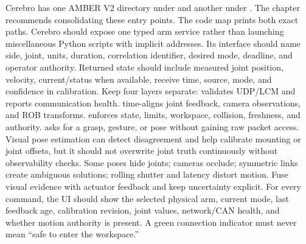 {}
\markdownRendererSectionEnd \markdownRendererSectionBegin
{}\markdownRendererInterblockSeparator
{}\markdownRendererBlockQuoteBegin
{} Cerebro has one AMBER V2 directory under  and another under . The chapter recommends consolidating these entry points. The code map prints both exact paths.\markdownRendererBlockQuoteEnd \markdownRendererInterblockSeparator
{}Cerebro should expose one typed arm service rather than launching miscellaneous Python scripts with implicit addresses. Its interface should name side, joint, units, duration, correlation identifier, desired mode, deadline, and operator authority. Returned state should include measured joint position, velocity, current/status when available, receive time, source, mode, and confidence in calibration.\markdownRendererParagraphSeparator
{}Keep four layers separate:\markdownRendererInterblockSeparator
{}\markdownRendererOlBegin
{} validates UDP/LCM and reports communication health.\markdownRendererOlItemEnd 
{} time-aligns joint feedback, camera observations, and ROB transforms.\markdownRendererOlItemEnd 
{} enforces state, limits, workspace, collision, freshness, and authority.\markdownRendererOlItemEnd 
{} asks for a grasp, gesture, or pose without gaining raw packet access.\markdownRendererOlItemEnd 
\markdownRendererOlEnd \markdownRendererInterblockSeparator
{}Visual pose estimation can detect disagreement and help calibrate mounting or joint offsets, but it should not overwrite joint truth continuously without observability checks. Some poses hide joints; cameras occlude; symmetric links create ambiguous solutions; rolling shutter and latency distort motion. Fuse visual evidence with actuator feedback and keep uncertainty explicit.\markdownRendererParagraphSeparator
{}For every command, the UI should show the selected physical arm, current mode, last feedback age, calibration revision, joint values, network/CAN health, and whether motion authority is present. A green connection indicator must never mean “safe to enter the workspace.”\markdownRendererInterblockSeparator
